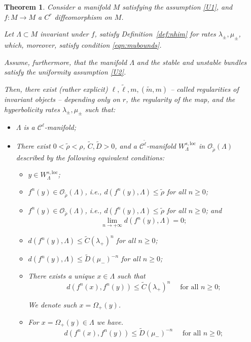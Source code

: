 \documentclass[11pt]{amsart}
\newtheorem{thm}{Theorem}[section]
\theoremstyle{definition}
\theoremstyle{remark}
\numberwithin{equation}{section}
\newcommand{\C}{\mathcal{C}}
\newcommand{\OO}{\mathcal{O}}
\begin{document}
\begin{thm}
  \label{localstable}
  Consider a  manifold $M$ satisfying the assumption \eqref{U1}, and
  $f:M\to M$ a $C^r$ diffeomorphism on $M$.

  Let $\Lambda \subset M$  invariant under $f$,
  satisfy Definition~\ref{def:nhim} for rates $\lambda_\pm, \mu_\pm$, which, moreover, satisfy condition \eqref{eqn:mubounds}.

  Assume, furthermore, that   the manifold $\Lambda$ and
  the stable and unstable bundles satisfy the uniformity assumption \eqref{U2}.

  Then, there exist (rather explicit)
  $\ell, \tilde \ell, m, (\tilde m, m) $ -- called regularities
  of invariant objects --
  depending only on $r$, the regularity of the map,
  and the hyperbolicity rates $\lambda_\pm, \mu_\pm$ such that:
\begin{itemize}
\item [(I)]
$\Lambda$ is a $\C^\ell$-manifold;
\item[(II)]
There exist $0<\tilde\rho <\rho$, $\tilde{C} ,\tilde{D} >0$, and a $\C^{\tilde \ell}$-manifold  $W^{s,\textrm{loc}}_\Lambda$ in $\OO_{\tilde\rho}(\Lambda)$
described by the following equivalent conditions:
  \begin{itemize}
\item[(i)]
      $y \in  W^{s,\textrm{loc}}_\Lambda$;
\item[(ii)]
      $f^n(y) \in \OO_{\tilde\rho}(\Lambda)$,
  i.e., $d(f^n(y), \Lambda) \le \tilde\rho$  for all $n \ge 0$;
\item[(iii)]
      $f^n(y) \in \OO_{\tilde\rho}(\Lambda)$,
  i.e., $d(f^n(y), \Lambda) \le \tilde\rho$  for all $n \ge 0$;
  and
  \[
   \lim_{n \to +\infty} d( f^n(y), \Lambda)  = 0;
  \]
\item[(iv)] $d(f^n(y), \Lambda) \le \tilde C  (\lambda_+)^n$   for all $n \ge 0$;

\item[(v)]  $d(f^n(y), \Lambda) \le \tilde D \left (\mu_-\right )^{-n}$   for all $n \ge 0$;
\item[(vi)]
      There exists a unique $x \in \Lambda$ such that
      \[
      d(f^n(x), f^n(y) ) \le \tilde C  (\lambda_+)^n
      \quad \textrm{ for all }n \ge 0;
      \]

      We denote such $x = \Omega_+(y)$.

    \item[(vii)] For
       $x = \Omega_+(y)  \in \Lambda$ we have.
      \[
      d(f^n(x), f^n(y) ) \le \tilde D \left ( \mu_- \right)^{-n}
      \quad \textrm{ for all }n \ge 0; \]


\end{itemize}
\end{itemize}
\end{thm}
\end{document}
